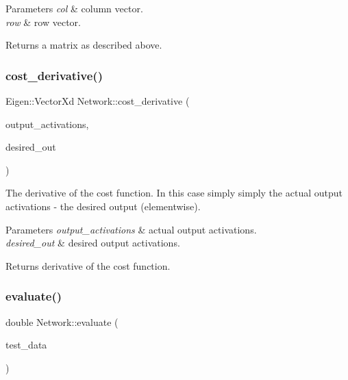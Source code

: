 \begin{DoxyParams}{Parameters}
{\em col} & column vector. \\
\hline
{\em row} & row vector. \\
\hline
\end{DoxyParams}
\begin{DoxyReturn}{Returns}
a matrix as described above. 
\end{DoxyReturn}
\mbox{\label{classNetwork_a108865a0ac7351810451cf9ee60b57ed}} 
\subsubsection{\texorpdfstring{cost\+\_\+derivative()}{cost\_derivative()}}
{\footnotesize\ttfamily Eigen\+::\+Vector\+Xd Network\+::cost\+\_\+derivative (\begin{DoxyParamCaption}\item[{Eigen\+::\+Vector\+Xd \&}]{output\+\_\+activations,  }\item[{Eigen\+::\+Vector\+Xd \&}]{desired\+\_\+out }\end{DoxyParamCaption})}

The derivative of the cost function. In this case simply simply the actual output activations -\/ the desired output (elementwise).


\begin{DoxyParams}{Parameters}
{\em output\+\_\+activations} & actual output activations. \\
\hline
{\em desired\+\_\+out} & desired output activations. \\
\hline
\end{DoxyParams}
\begin{DoxyReturn}{Returns}
derivative of the cost function. 
\end{DoxyReturn}
\mbox{\label{classNetwork_a062ac4352c92fc2bd88b51bbc29c25a4}} 
\subsubsection{\texorpdfstring{evaluate()}{evaluate()}}
{\footnotesize\ttfamily double Network\+::evaluate (\begin{DoxyParamCaption}\item[{std\+::vector$<$ sample $>$}]{test\+\_\+data }\end{DoxyParamCaption})}

